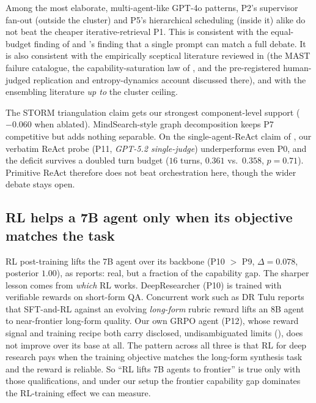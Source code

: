 \documentclass[11pt]{article}
\begin{document}
Among the most elaborate, multi-agent-like GPT-4o patterns, P2's supervisor
fan-out (outside the cluster) and P5's hierarchical scheduling (inside it) alike do not
beat the cheaper iterative-retrieval P1. This is consistent with the equal-budget
finding of \citet{tran2026single} and \citet{wang2024rethinking}'s finding that a single
prompt can match a full debate. It is also consistent with the empirically sceptical
literature reviewed in  (the MAST failure
catalogue, the capability-saturation law of \citet{scaling_agents2025}, and the
pre-registered human-judged replication and entropy-dynamics account discussed there),
and with the ensembling literature \emph{up to} the cluster ceiling.

The STORM triangulation claim \citep{shao2024storm} gets our strongest component-level
support ($-0.060$ when ablated). MindSearch-style graph decomposition
\citep{mindsearch2024} keeps P7 competitive but adds nothing separable. On the
single-agent-ReAct claim of \citet{stepdeepresearch2025}, our verbatim ReAct probe (P11,
\emph{GPT-5.2 single-judge}) underperforms even P0, and the deficit survives a doubled
turn budget ($16$ turns, $0.361$ vs.\ $0.358$, $p{=}0.71$). Primitive ReAct therefore
does not beat orchestration here, though the wider debate stays open.

\subsection{RL helps a 7B agent only when its objective matches the task}
RL post-training lifts the 7B agent over its backbone (P10 $>$ P9, $\Delta=0.078$,
posterior $1.00$), as  reports: real, but a fraction of the capability
gap. The sharper lesson comes from \emph{which} RL works. DeepResearcher (P10) is
trained with verifiable rewards on short-form QA. Concurrent work such as DR Tulu
\citep{shao2025drtulu} reports that SFT-and-RL against an evolving \emph{long-form}
rubric reward lifts an 8B agent to near-frontier long-form quality. Our own GRPO agent
(P12), whose reward signal and training recipe both carry disclosed, undisambiguated
limits (), does not improve over its base at all.
The pattern across all three is that RL for deep research pays when the training
objective matches the long-form synthesis task and the reward is reliable. So ``RL lifts
7B agents to frontier'' is true only with those qualifications, and under our setup the
frontier capability gap dominates the RL-training effect we can measure.
\end{document}
